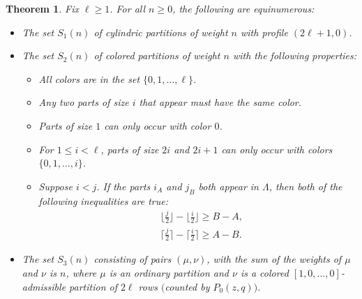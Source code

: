 \documentclass[10pt,a4paper]{amsart}
\numberwithin{equation}{section}
\newtheorem{Theorem}{Theorem}[section]
\theoremstyle{definition}
\begin{document}
\begin{Theorem} \label{thm:bij}
Fix $\ell\ge1$. For all $n\ge0$, the following are equinumerous:
\begin{itemize}\itemsep=0pt
\item The set $S_1(n)$ of cylindric partitions of weight $n$ with profile $(2\ell+1,0)$.
\item The set $S_2(n)$ of colored partitions of weight $n$ with the following properties:
\begin{itemize}\itemsep=0pt
\item All colors are in the set $\{0,1,\dots,\ell\}$.
\item Any two parts of size $i$ that appear must have the same color.
\item Parts of size $1$ can only occur with color $0$.
\item For $1\le i < \ell$, parts of size $2i$ and $2i+1$ can only occur with colors $\{0,1,\dots,i\}$.
\item Suppose $i<j$. If the parts $i_A$ and $j_{B}$ both appear in $\Lambda$, then both of the following inequalities are true:
\begin{align}
& \biggl\lfloor\frac j2\biggr\rfloor-\biggl\lfloor\frac i2\biggr\rfloor \ge B - A, \label{eq:floor} \\
& \biggl\lceil\frac j2\biggr\rceil-\biggl\lceil\frac i2\biggr\rceil \ge A - B. \label{eq:ceil}
\end{align}
\end{itemize}
\item The set $S_3(n)$ consisting of pairs $(\mu,\nu)$, with the sum of the weights of $\mu$ and $\nu$ is $n$, where $\mu$ is an ordinary partition and $\nu$ is a colored $[1,0,\dots,0]$-admissible partition of $2\ell$ rows $($counted by $P_0(z,q))$.
\end{itemize}
\end{Theorem}
\end{document}
